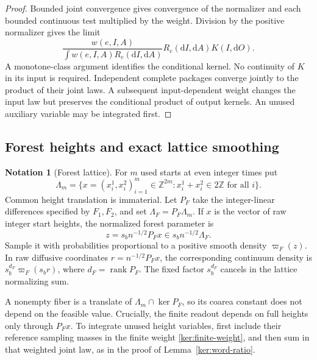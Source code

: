 \documentclass[11pt]{article}
\numberwithin{equation}{section}
\theoremstyle{definition}
\newtheorem{notation}[theorem]{Notation}
\theoremstyle{remark}
\newcommand{\Z}{\mathbb Z}
\newcommand{\dd}{\mathrm d}
\newcommand{\1}{\mathbf 1}
\begin{document}
\begin{proof}
Bounded joint convergence gives convergence of the normalizer and
each bounded continuous test multiplied by the weight.  Division
by the positive normalizer gives the limit
\[
 \frac{w(e,I,A)}{\int w(e,I,A)R_e(\dd I,\dd A)}
 R_e(\dd I,\dd A)K(I,\dd O).
\]
A monotone-class argument identifies the conditional kernel.
No continuity of \(K\) in its input is required.
Independent complete packages converge jointly to the product of
their joint laws.  A subsequent input-dependent weight changes the
input law but preserves the conditional product of output kernels.
An unused auxiliary variable may be integrated first.
\end{proof}

\subsection{Forest heights and exact lattice smoothing}

\begin{notation}[Forest lattice]\label{ker:lattice}
For \(m\) used starts at even integer times put
\[
 \Lambda_m=\{x=(x_i^1,x_i^2)_{i=1}^m\in\Z^{2m}:
                    x_i^1+x_i^2\in2\Z\text{ for all }i\}.
\]
Common height translation is immaterial.  Let \(P_F\) take the
integer-linear differences specified by \(F_1,F_2\), and set
\(\Lambda_F=P_F\Lambda_m\).
If \(x\) is the vector of raw integer start heights, the normalized
forest parameter is
\begin{equation}\label{ker:forest-units}
 z=s_b n^{-1/2}P_Fx\in s_b n^{-1/2}\Lambda_F.
\end{equation}
Sample it with probabilities proportional to a positive smooth density
\(\varpi_F(z)\).  In raw diffusive coordinates \(r=n^{-1/2}P_Fx\), the
corresponding continuum density is
\(s_b^{d_F}\varpi_F(s_br)\), where \(d_F=\operatorname{rank}P_F\).
The fixed factor \(s_b^{d_F}\) cancels in the lattice normalizing sum.
\end{notation}

A nonempty fiber is a translate of \(\Lambda_m\cap\ker P_F\), so its
coarea constant does not depend on the feasible value.  Crucially,
the finite readout depends on full heights only through \(P_Fx\).
To integrate unused height variables, first include their reference
sampling masses in the finite weight \eqref{ker:finite-weight}, and then
sum in that weighted joint law, as in the proof of
Lemma~\ref{ker:word-ratio}.
\end{document}

